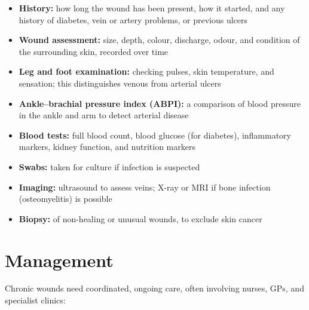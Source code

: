 \begin{itemize}
    \item \textbf{History:} how long the wound has been present, how it started, and any history of diabetes, vein or artery problems, or previous ulcers
    \item \textbf{Wound assessment:} size, depth, colour, discharge, odour, and condition of the surrounding skin, recorded over time
    \item \textbf{Leg and foot examination:} checking pulses, skin temperature, and sensation; this distinguishes venous from arterial ulcers
    \item \textbf{Ankle--brachial pressure index (ABPI):} a comparison of blood pressure in the ankle and arm to detect arterial disease
    \item \textbf{Blood tests:} full blood count, blood glucose (for diabetes), inflammatory markers, kidney function, and nutrition markers
    \item \textbf{Swabs:} taken for culture if infection is suspected
    \item \textbf{Imaging:} ultrasound to assess veins; X-ray or MRI if bone infection (osteomyelitis) is possible
    \item \textbf{Biopsy:} of non-healing or unusual wounds, to exclude skin cancer
\end{itemize}

\section*{Management}
Chronic wounds need coordinated, ongoing care, often involving nurses, GPs, and specialist clinics:


